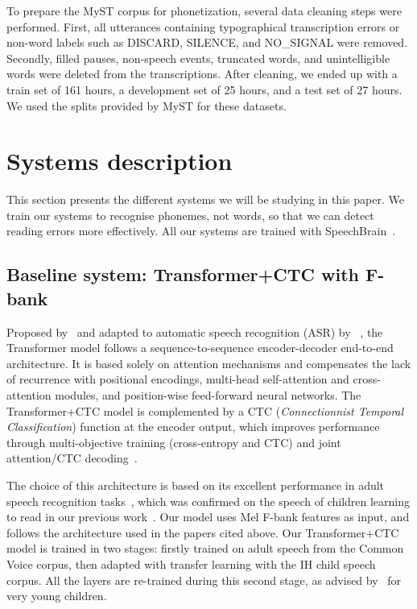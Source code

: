 \documentclass{Interspeech2024}
\begin{document}
To prepare the MyST corpus for phonetization, several data cleaning steps were performed. First, all utterances containing typographical transcription errors or non-word labels such as DISCARD, SILENCE, and NO\_SIGNAL were removed. Secondly, filled pauses, non-speech events, truncated words, and unintelligible words were deleted from the transcriptions. After cleaning, we ended up with a train set of 161 hours, a development set of 25 hours, and a test set of 27 hours. We used the splits provided by MyST for these datasets.


\section{Systems description}

This section presents the different systems we will be studying in this paper.  We train our systems to recognise phonemes, not words, so that we can detect reading errors more effectively. All our systems are trained with SpeechBrain~\cite{Ravanelli2021-SB}.

\subsection{Baseline system: Transformer+CTC with F-bank}

Proposed by~\cite{Vaswani2017-AIA} and adapted to automatic speech recognition (ASR) by ~\cite{Dong2018-STR}, the Transformer model follows a sequence-to-sequence encoder-decoder end-to-end architecture. 
It is based solely on attention mechanisms and compensates the lack of recurrence with positional encodings, multi-head self-attention and cross-attention modules, and position-wise feed-forward neural networks.
The Transformer+CTC model is complemented by a CTC (\textit{Connectionnist Temporal Classification}) function at the encoder output, which improves performance through multi-objective training (cross-entropy and CTC) and joint attention/CTC decoding~\cite{Watanabe2017-HCA, Karita2019-ITB}.

The choice of this architecture is based on its excellent performance in adult speech recognition tasks~\cite{Karita2019-ACS}, which was confirmed on the speech of children learning to read in our previous work~\cite{Gelin2021-SPECOM, Gelin2022-JEP}. Our model uses Mel F-bank features as input, and follows the architecture used in the papers cited above. 
Our Transformer+CTC model is trained in two stages: firstly trained on adult speech from the Common Voice corpus, then adapted with transfer learning with the IH child speech corpus.
All the layers are re-trained during this second stage, as advised by~\cite{Shivakumar20-TLF} for very young children.
\end{document}
